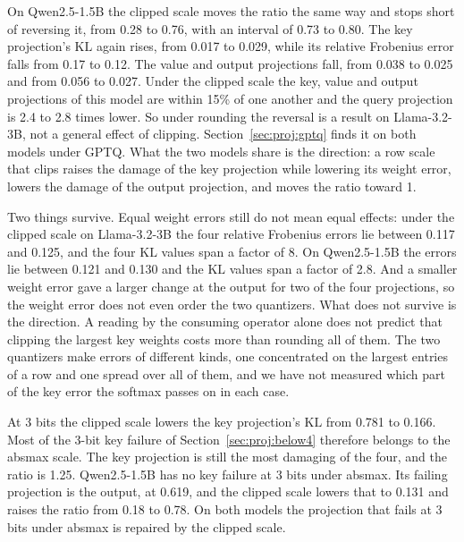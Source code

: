 \documentclass[journal]{IEEEtran}
\newcommand{\KL}{\mathrm{KL}}
\begin{document}
On Qwen2.5-1.5B the clipped scale moves the ratio the same way and stops short of reversing it,
from 0.28 to 0.76, with an interval of 0.73 to 0.80. The key projection's $\KL$ again rises, from
0.017 to 0.029, while its relative Frobenius error falls from 0.17 to 0.12. The value and output
projections fall, from 0.038 to 0.025 and from 0.056 to 0.027. Under the clipped scale the key,
value and output projections of this model are within 15\% of one another and the query
projection is 2.4 to 2.8 times lower. So under rounding the reversal is a result on Llama-3.2-3B, not a general
effect of clipping. Section~\ref{sec:proj:gptq} finds it on both models under GPTQ. What the two models share is the direction: a row scale that clips raises the
damage of the key projection while lowering its weight error, lowers the damage of the output
projection, and moves the ratio toward 1.

Two things survive. Equal weight errors still do not mean equal effects: under the clipped scale
on Llama-3.2-3B the four relative Frobenius errors lie between 0.117 and 0.125, and the four
$\KL$ values span a factor of 8. On Qwen2.5-1.5B the errors lie between 0.121 and 0.130 and the
$\KL$ values span a factor of 2.8. And a smaller weight error gave a larger change at the output for two of the four
projections, so the weight error does not even order the two quantizers. What does not survive
is the direction. A reading by the consuming operator alone does not predict that clipping the
largest key weights costs more than rounding all of them. The two quantizers make errors of
different kinds, one concentrated on the largest entries of a row and one spread over all of
them, and we have not measured which part of the key error the softmax passes on in each case.

At 3 bits the clipped scale lowers the key projection's $\KL$ from 0.781 to 0.166. Most of the
3-bit key failure of Section~\ref{sec:proj:below4} therefore belongs to the absmax scale. The
key projection is still the most damaging of the four, and the ratio is 1.25. Qwen2.5-1.5B has no
key failure at 3 bits under absmax. Its failing projection is the output, at 0.619, and the
clipped scale lowers that to 0.131 and raises the ratio from 0.18 to 0.78. On both models the
projection that fails at 3 bits under absmax is repaired by the clipped scale.
\end{document}
